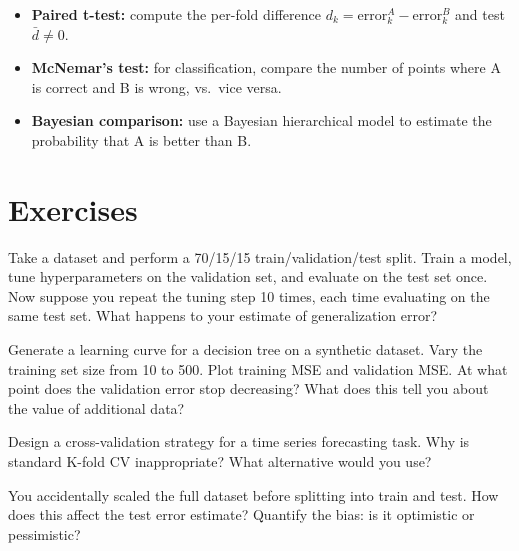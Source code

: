 \begin{itemize}
	\item \textbf{Paired t-test:} compute the per-fold difference $d_k = \text{error}_k^A - \text{error}_k^B$ and test $\bar{d} \neq 0$.
	\item \textbf{McNemar's test:} for classification, compare the number of points where A is correct and B is wrong, vs.\ vice versa.
	\item \textbf{Bayesian comparison:} use a Bayesian hierarchical model to estimate the probability that A is better than B.
\end{itemize}

\section{Exercises}

\begin{exercise}
	Take a dataset and perform a 70/15/15 train/validation/test split. Train a model, tune hyperparameters on the validation set, and evaluate on the test set once. Now suppose you repeat the tuning step 10 times, each time evaluating on the same test set. What happens to your estimate of generalization error?
\end{exercise}

\begin{exercise}
	Generate a learning curve for a decision tree on a synthetic dataset. Vary the training set size from 10 to 500. Plot training MSE and validation MSE. At what point does the validation error stop decreasing? What does this tell you about the value of additional data?
\end{exercise}

\begin{exercise}
	Design a cross-validation strategy for a time series forecasting task. Why is standard K-fold CV inappropriate? What alternative would you use?
\end{exercise}

\begin{exercise}
	You accidentally scaled the full dataset before splitting into train and test. How does this affect the test error estimate? Quantify the bias: is it optimistic or pessimistic?
\end{exercise}
